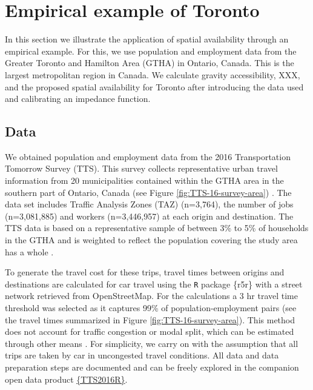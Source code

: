 \documentclass[]{elsarticle} %
\begin{document}
\hypertarget{empirical-example-of-toronto}{%
\section{Empirical example of
Toronto}\label{empirical-example-of-toronto}}

In this section we illustrate the application of spatial availability
through an empirical example. For this, we use population and employment
data from the Greater Toronto and Hamilton Area (GTHA) in Ontario,
Canada. This is the largest metropolitan region in Canada. We calculate
gravity accessibility, XXX, and the proposed spatial availability for
Toronto after introducing the data used and calibrating an impedance
function.

\hypertarget{data}{%
\subsection{Data}\label{data}}

We obtained population and employment data from the 2016 Transportation
Tomorrow Survey (TTS). This survey collects representative urban travel
information from 20 municipalities contained within the GTHA area in the
southern part of Ontario, Canada (see Figure
\ref{fig:TTS-16-survey-area}) \citep{data_management_group_tts_2018}.
The data set includes Traffic Analysis Zones (TAZ) (n=3,764), the number
of jobs (n=3,081,885) and workers (n=3,446,957) at each origin and
destination. The TTS data is based on a representative sample of between
3\% to 5\% of households in the GTHA and is weighted to reflect the
population covering the study area has a whole
\citep{data_management_group_tts_2018}.

To generate the travel cost for these trips, travel times between
origins and destinations are calculated for car travel using the
\texttt{R} package \{r5r\} \citep{r5r_2021} with a street network
retrieved from OpenStreetMap. For the calculations a 3 hr travel time
threshold was selected as it captures 99\% of population-employment
pairs (see the travel times summarized in Figure
\ref{fig:TTS-16-survey-area}). This method does not account for traffic
congestion or modal split, which can be estimated through other means
\citep[e.g.,][]{allen_suburbanization_2021, higgins2021changes}. For
simplicity, we carry on with the assumption that all trips are taken by
car in uncongested travel conditions. All data and data preparation
steps are documented and can be freely explored in the companion open
data product \href{https://soukhova.github.io/TTS2016R/}{\{TTS2016R\}}.
\end{document}
